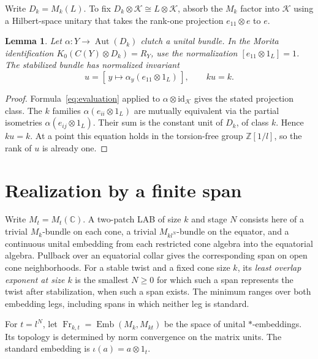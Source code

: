\documentclass[11pt]{article}
\newtheorem{lemma}[theorem]{Lemma}
\DeclareMathOperator{\Aut}{Aut}
\DeclareMathOperator{\Emb}{Emb}
\DeclareMathOperator{\Fr}{Fr}
\newcommand{\K}{\mathcal K}
\newcommand{\Z}{\mathbb Z}
\newcommand{\C}{\mathbb C}
\newcommand{\id}{\mathrm{id}}
\newcommand{\RY}{R_Y}
\begin{document}
Write \(D_k=M_k(L)\). To fix \(D_k\otimes\K\cong L\otimes\K\), absorb the \(M_k\) factor into \(\K\) using a Hilbert-space unitary that takes the rank-one projection \(e_{11}\otimes e\) to \(e\).

\begin{lemma}\label{lem:corner}
Let \(\alpha:Y\to\Aut(D_k)\) clutch a unital bundle. In the Morita identification \(K_0(C(Y)\otimes D_k)=\RY\), use the normalization \([e_{11}\otimes1_L]=1\). The stabilized bundle has normalized invariant
\[
  u=[\,y\longmapsto\alpha_y(e_{11}\otimes1_L)\,],
  \qquad ku=k .
\]
\end{lemma}
\begin{proof}
Formula~\eqref{eq:evaluation} applied to \(\alpha\otimes\id_{\K}\) gives the stated projection class. The \(k\) families \(\alpha(e_{ii}\otimes1_L)\) are mutually equivalent via the partial isometries \(\alpha(e_{ij}\otimes1_L)\). Their sum is the constant unit of \(D_k\), of class \(k\). Hence \(ku=k\). At a point this equation holds in the torsion-free group \(\Z[1/l]\), so the rank of \(u\) is already one.
\end{proof}

\section{Realization by a finite span}\label{sec:frames}

Write \(M_t=M_t(\C)\). A two-patch LAB of size \(k\) and stage \(N\) consists here of a trivial \(M_k\)-bundle on each cone, a trivial \(M_{kl^N}\)-bundle on the equator, and a continuous unital embedding from each restricted cone algebra into the equatorial algebra. Pullback over an equatorial collar gives the corresponding span on open cone neighborhoods. For a stable twist and a fixed cone size \(k\), its \emph{least overlap exponent at size \(k\)} is the smallest \(N\geq0\) for which such a span represents the twist after stabilization, when such a span exists. The minimum ranges over both embedding legs, including spans in which neither leg is standard.

For \(t=l^N\), let \(\Fr_{k,t}=\Emb(M_k,M_{kt})\) be the space of unital \(*\)-embeddings. Its topology is determined by norm convergence on the matrix units. The standard embedding is \(\iota(a)=a\otimes 1_t\).
\end{document}
